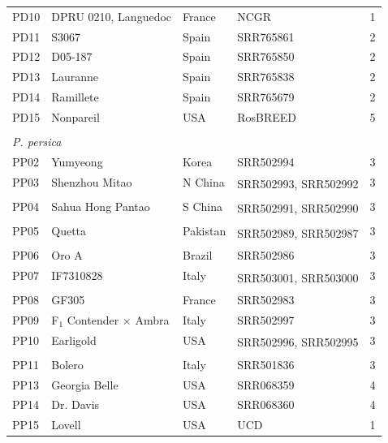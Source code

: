\documentclass[12pt]{article}
\begin{document}
\begin{center}
\begin{longtable}{llllc}
	PD10 &DPRU 0210, Languedoc &France &NCGR &1\\
	PD11 &S3067 &Spain &SRR765861 &2\\
	PD12 &D05-187 &Spain &SRR765850 &2\\
	PD13 &Lauranne &Spain &SRR765838 &2\\
	PD14 &Ramillete &Spain &SRR765679 &2\\
	PD15 &Nonpareil & USA&RosBREED &5\\
	\\
	\multicolumn{5}{l}{\emph{P. persica}}  \\ %
	PP02 &Yumyeong &Korea &SRR502994 &3\\
	PP03 &Shenzhou Mitao &N China &
	\multirow{2}{1cm}{SRR502993, SRR502992} &3\\
	\\
	PP04 &Sahua Hong Pantao &S China &
	\multirow{2}{1cm}{SRR502991, SRR502990} &3\\
	\\
	PP05 &Quetta &Pakistan &
	\multirow{2}{1cm}{SRR502989, SRR502987} &3\\
	\\
	PP06 &Oro A &Brazil &SRR502986 &3\\
	PP07 &IF7310828 &Italy &
	\multirow{2}{2cm}{SRR503001, SRR503000} &3\\
	\\
	PP08 &GF305 &France &SRR502983 &3\\
	PP09 &F$_{1}$ Contender $\times$ Ambra &Italy &SRR502997 &3\\
	PP10 &Earligold &USA &
	\multirow{2}{1cm}{SRR502996, SRR502995} &3\\
	\\
	PP11 &Bolero &Italy &SRR501836 &3\\
	PP13 &Georgia Belle &USA &SRR068359 &4\\
	PP14 &Dr. Davis &USA &SRR068360 &4\\
	PP15 &Lovell &USA &UCD &1\\

\end{longtable}
\end{center}
\end{document}
